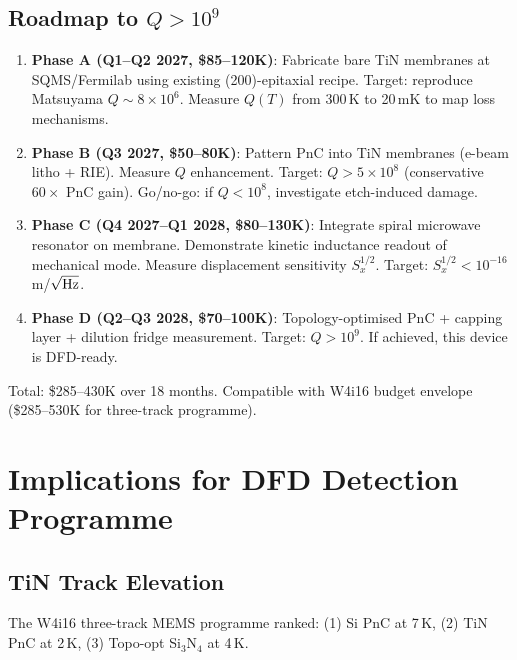 \documentclass[11pt]{article}
\theoremstyle{remark}
\newcommand{\ee}[1]{\times 10^{#1}}
\begin{document}
\subsection{Roadmap to $Q > 10^9$}

\begin{enumerate}[nosep]
  \item \textbf{Phase A (Q1--Q2 2027, \$85--120K)}: Fabricate bare TiN
    membranes at SQMS/Fermilab using existing (200)-epitaxial recipe.
    Target: reproduce Matsuyama $Q \sim 8\ee{6}$.
    Measure $Q(T)$ from 300\,K to 20\,mK to map loss mechanisms.
  \item \textbf{Phase B (Q3 2027, \$50--80K)}: Pattern PnC into TiN
    membranes (e-beam litho + RIE). Measure $Q$ enhancement.
    Target: $Q > 5\ee{8}$ (conservative $60\times$ PnC gain).
    Go/no-go: if $Q < 10^8$, investigate etch-induced damage.
  \item \textbf{Phase C (Q4 2027--Q1 2028, \$80--130K)}: Integrate
    spiral microwave resonator on membrane. Demonstrate kinetic
    inductance readout of mechanical mode. Measure displacement
    sensitivity $S_x^{1/2}$.
    Target: $S_x^{1/2} < 10^{-16}$\,m/$\sqrt{\rm Hz}$.
  \item \textbf{Phase D (Q2--Q3 2028, \$70--100K)}: Topology-optimised
    PnC + capping layer + dilution fridge measurement.
    Target: $Q > 10^9$. If achieved, this device is DFD-ready.
\end{enumerate}

Total: \$285--430K over 18 months. Compatible with W4i16 budget envelope
(\$285--530K for three-track programme).


\section{Implications for DFD Detection Programme}
\label{sec:implications}

\subsection{TiN Track Elevation}

The W4i16 three-track MEMS programme ranked:
(1) Si PnC at 7\,K, (2) TiN PnC at 2\,K, (3) Topo-opt Si$_3$N$_4$ at 4\,K.
\end{document}
